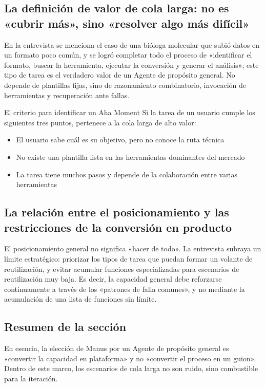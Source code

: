 \subsection{La definición de valor de cola larga: no es «cubrir más», sino «resolver algo más difícil»}

En la entrevista se menciona el caso de una bióloga molecular que subió datos en un formato poco común, y se logró completar todo el proceso de «identificar el formato, buscar la herramienta, ejecutar la conversión y generar el análisis»; este tipo de tarea es el verdadero valor de un Agente de propósito general. No depende de plantillas fijas, sino de razonamiento combinatorio, invocación de herramientas y recuperación ante fallas.

\begin{importantbox}{El criterio para identificar un Aha Moment}
Si la tarea de un usuario cumple los siguientes tres puntos, pertenece a la cola larga de alto valor:
\begin{itemize}
    \item El usuario sabe cuál es su objetivo, pero no conoce la ruta técnica
    \item No existe una plantilla lista en las herramientas dominantes del mercado
    \item La tarea tiene muchos pasos y depende de la colaboración entre varias herramientas
\end{itemize}
\end{importantbox}

\subsection{La relación entre el posicionamiento y las restricciones de la conversión en producto}

El posicionamiento general no significa «hacer de todo». La entrevista subraya un límite estratégico: priorizar los tipos de tarea que puedan formar un volante de reutilización, y evitar acumular funciones especializadas para escenarios de reutilización muy baja. Es decir, la capacidad general debe reforzarse continuamente a través de los «patrones de falla comunes», y no mediante la acumulación de una lista de funciones sin límite.

\subsection{Resumen de la sección}

En esencia, la elección de Manus por un Agente de propósito general es «convertir la capacidad en plataforma» y no «convertir el proceso en un guion». Dentro de este marco, los escenarios de cola larga no son ruido, sino combustible para la iteración.
